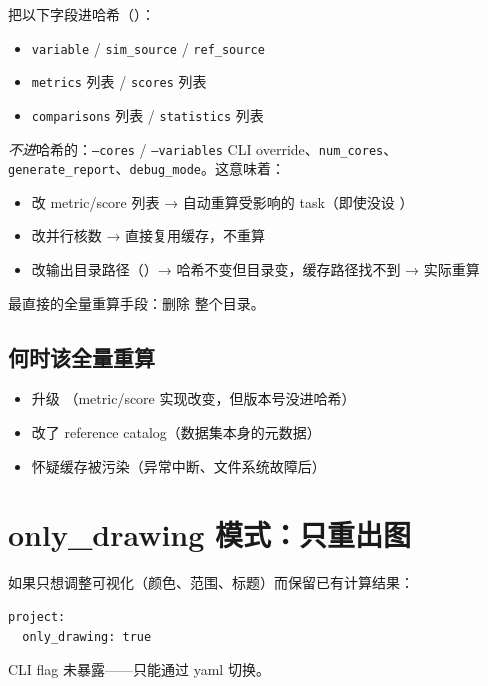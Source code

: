  把以下字段进哈希（）：

\begin{itemize}
  \item \texttt{variable} / \texttt{sim\_source} / \texttt{ref\_source}
  \item \texttt{metrics} 列表 / \texttt{scores} 列表
  \item \texttt{comparisons} 列表 / \texttt{statistics} 列表
\end{itemize}

\emph{不进}哈希的：\texttt{--cores} / \texttt{--variables} CLI override、\texttt{num\_cores}、\texttt{generate\_report}、\texttt{debug\_mode}。这意味着：

\begin{itemize}
  \item 改 metric/score 列表 → 自动重算受影响的 task（即使没设 ）
  \item 改并行核数 → 直接复用缓存，不重算
  \item 改输出目录路径（）→ 哈希不变但目录变，缓存路径找不到 → 实际重算
\end{itemize}

最直接的全量重算手段：删除  整个目录。

\subsection{何时该全量重算}

\begin{itemize}
  \item 升级 \openbench{}（metric/score 实现改变，但版本号没进哈希）
  \item 改了 reference catalog（数据集本身的元数据）
  \item 怀疑缓存被污染（异常中断、文件系统故障后）
\end{itemize}

\section{only\_drawing 模式：只重出图}

如果只想调整可视化（颜色、范围、标题）而保留已有计算结果：

\begin{verbatim}
project:
  only_drawing: true
\end{verbatim}

CLI flag 未暴露——只能通过 yaml 切换。

